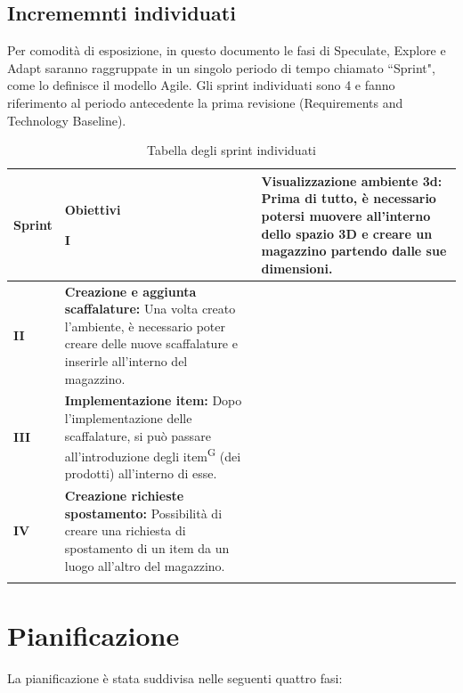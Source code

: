 \subsection{Incrememnti individuati}\label{sec:modello_sviluppo:incrementi}
Per comodità di esposizione, in questo documento le fasi di Speculate, Explore e Adapt saranno raggruppate in un singolo periodo di tempo chiamato ``Sprint", come lo definisce il modello Agile.
Gli sprint individuati sono 4 e fanno riferimento al periodo antecedente la prima revisione (Requirements and Technology Baseline).
\begin{xltabular}{\textwidth}{p{0.05\textwidth} | p{0.5\textwidth} }

    \textbf{\color{white} Sprint} & \textbf{\color{white} Obiettivi} \ 
    \hline
    \endhead
    
    \textbf{I} 
    & \textbf{Visualizzazione ambiente 3d:} Prima di tutto, è necessario potersi muovere all'interno dello spazio 3D e creare un magazzino partendo dalle sue dimensioni. \\
    \hline

    \textbf{II} 
    & \textbf{Creazione e aggiunta scaffalature:} Una volta creato l'ambiente, è necessario poter creare delle nuove scaffalature e inserirle all'interno del magazzino. \\
    \hline

    \textbf{III} 
    & \textbf{Implementazione item:} Dopo l'implementazione delle scaffalature, si può passare all'introduzione degli item\textsuperscript{G} (dei prodotti) all'interno di esse. \\
    \hline

    \textbf{IV} 
    & \textbf{Creazione richieste spostamento:} Possibilità di creare una richiesta di spostamento di un item da un luogo all'altro del magazzino. \\
    \hline

\caption{Tabella degli sprint individuati}\label{tab:incrementi}
\end{xltabular}

\newpage
\section{Pianificazione}\label{sec:pianificazione}

La pianificazione è stata suddivisa nelle seguenti quattro fasi:

